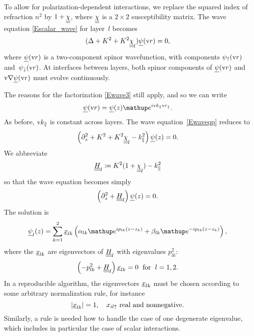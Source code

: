 
To allow for polarization-dependent interactions,
we replace the squared index of refraction $n^2$
by $1+\underline{\underline{\chi}}$, where $\underline{\underline{\chi}}$ is a $2\times 2$ susceptibility matrix.
The wave equation \cref{Escalar_wave} for layer~$l$ becomes
\begin{equation}\label{Ewaveqp}
(\Delta +K^2 +K^2 \underline{\underline{\chi}}_l) \underline{\psi}(\text{v}{r})= 0,
\end{equation}
where $\underline{\psi}(\text{v}{r})$ is a two-component spinor wavefunction,
with components $\psi_\uparrow(\text{v}{r})$ and~$\psi_\downarrow(\text{v}{r})$.
At interfaces between layers,
both spinor components of $\underline{\psi}(\text{v}{r})$ and $\text{v}{\nabla}\underline{\psi}(\text{v}{r})$
must evolve continuously.

The reasons for the factorization \cref{Ewave3} still apply,
and so we can write
\begin{equation}\label{Ewave3p}
\u\psi(\r) = \u\psi(z) \e^{i \k_\parallel\r_\parallel}.
\end{equation}
As before, $\text{v}{k}_\parallel$ is constant across layers.
The wave equation~\cref{Ewaveqp} reduces to
\begin{equation}\label{Ewavezp}
\left(\partial_z^2 + K^2 + K^2\underline{\underline{\chi}}_l - k_\parallel^2 \right) \underline{\psi}(z) = 0.
\end{equation}
We abbreviate
\begin{equation}
  \underline{\underline{H}}_l \coloneqq  K^2(1+\underline{\underline{\chi}}_l)-k_\parallel^2
\end{equation}
so that the wave equation becomes simply
\begin{equation}\label{Ewaveqp2}
  \left(\partial_z^2 + \underline{\underline{H}}_l\right) \underline{\psi}(z) = 0.
\end{equation}
The solution is
\begin{equation}\label{Epsizp}
  \u\psi_l(z)
  = \sum_{k=1}^2 \u x_{l k}\left(\alpha_{l k}\e^{i p_{l k}(z-z_k)}
                            + \beta_{l k}\e^{-i p_{l k}(z-z_k)}\right),
\end{equation}
where the $\underline{x}_{l k}$ are eigenvectors of $\underline{\underline{H}}_l$
with eigenvalues $p_{l k}^2$:
\begin{equation}
  \left( -p_{l k}^2 + \underline{\underline{H}}_l \right) \underline{x}_{l k} = 0
   \;\text{ for }\;l=1,2.
\end{equation}
In a reproducible algorithm,
the eigenvectors $\underline{x}_{l k}$ must be chosen according to some arbitrary
normalization rule,
for instance
\begin{equation}
  |\underline{x}_{l k}|=1,\quad x_{il\uparrow} \text{ real and nonnegative}.
\end{equation}
Similarly,
a rule is needed how to handle the case of one degenerate eigenvalue,
which includes in particular the case of scalar interactions.


